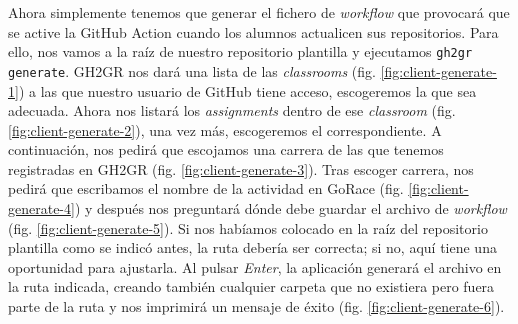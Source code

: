 Ahora simplemente tenemos que generar el fichero de \textit{workflow} que provocará que se active la GitHub Action cuando los alumnos actualicen sus repositorios. Para ello, nos vamos a la raíz de nuestro repositorio plantilla y ejecutamos \texttt{gh2gr generate}. GH2GR nos dará una lista de las \textit{classrooms} (fig. \ref{fig:client-generate-1}) a las que nuestro usuario de GitHub tiene acceso, escogeremos la que sea adecuada. Ahora nos listará los \textit{assignments} dentro de ese \textit{classroom} (fig. \ref{fig:client-generate-2}), una vez más, escogeremos el correspondiente. A continuación, nos pedirá que escojamos una carrera de las que tenemos registradas en GH2GR (fig. \ref{fig:client-generate-3}). Tras escoger carrera, nos pedirá que escribamos el nombre de la actividad en GoRace (fig. \ref{fig:client-generate-4}) y después nos preguntará dónde debe guardar el archivo de \textit{workflow} (fig. \ref{fig:client-generate-5}). Si nos habíamos colocado en la raíz del repositorio plantilla como se indicó antes, la ruta debería ser correcta; si no, aquí tiene una oportunidad para ajustarla. Al pulsar \textit{Enter}, la aplicación generará el archivo en la ruta indicada, creando también cualquier carpeta que no existiera pero fuera parte de la ruta y nos imprimirá un mensaje de éxito (fig. \ref{fig:client-generate-6}).


